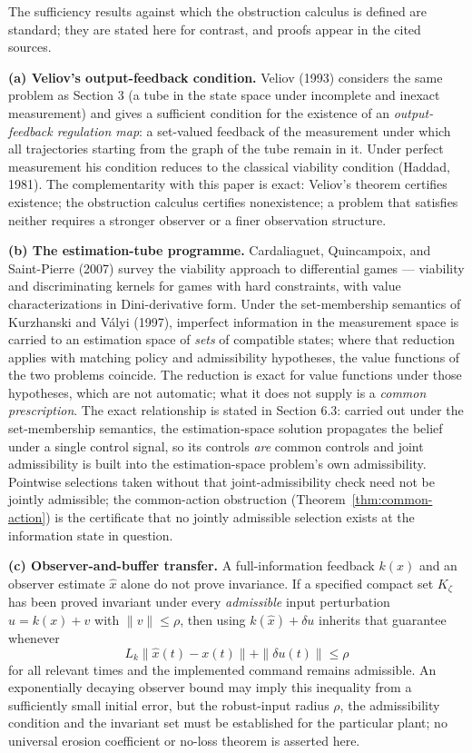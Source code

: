 \documentclass[11pt]{article}
\theoremstyle{definition}
\begin{document}
The sufficiency results against which the obstruction calculus is
defined are standard; they are stated here for contrast, and proofs
appear in the cited sources.

\textbf{(a) Veliov's output-feedback condition.} Veliov (1993) considers the same problem as Section 3 (a tube in the state space under incomplete and inexact measurement) and gives a sufficient condition for the
existence of an \emph{output-feedback regulation map}: a set-valued
feedback of the measurement under which all trajectories starting from
the graph of the tube remain in it. Under perfect measurement his
condition reduces to the classical viability condition (Haddad, 1981).
The complementarity with this paper is exact: Veliov's theorem certifies
existence; the obstruction calculus certifies nonexistence; a problem that satisfies neither requires a stronger observer or a finer observation structure.

\textbf{(b) The estimation-tube programme.} Cardaliaguet, Quincampoix,
and Saint-Pierre (2007) survey the viability approach to differential
games --- viability and discriminating kernels for games with hard
constraints, with value characterizations in Dini-derivative form.
Under the set-membership semantics of Kurzhanski and V\'alyi (1997),
imperfect information in the measurement space is carried to an
estimation space of \emph{sets} of compatible states; where that
reduction applies with matching policy and admissibility hypotheses,
the value functions of the two problems coincide. The reduction is
exact for value functions under those hypotheses, which are not
automatic; what it does not supply is a \emph{common prescription}. The exact relationship is stated in Section 6.3: carried out under the set-membership semantics, the estimation-space solution propagates the belief under a single control signal, so its controls \emph{are} common controls and joint admissibility is built into the estimation-space problem's own admissibility. Pointwise selections taken without that joint-admissibility check need not be jointly admissible; the common-action obstruction (Theorem~\ref{thm:common-action}) is the certificate that no jointly admissible selection exists at the information state in question.

\textbf{(c) Observer-and-buffer transfer.} A full-information feedback \(k(x)\) and an observer estimate \(\hat x\) alone do not prove invariance. If a specified compact set \(K_\zeta\) has been proved invariant under every \emph{admissible} input perturbation \(u=k(x)+v\) with \(\|v\|\le\rho\), then using \(k(\hat x)+\delta u\) inherits that guarantee whenever
\[L_k\|\hat x(t)-x(t)\|+\|\delta u(t)\|\le\rho\]
for all relevant times and the implemented command remains admissible. An exponentially decaying observer bound may imply this inequality from a sufficiently small initial error, but the robust-input radius \(\rho\), the admissibility condition and the invariant set must be established for the particular plant; no universal erosion coefficient or no-loss theorem is asserted here.
\end{document}
